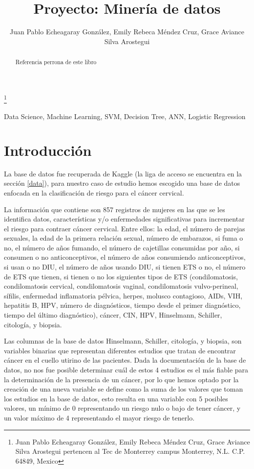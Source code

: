\documentclass[journal]{IEEEtran}                                                          %
\title{\LARGE \bf Proyecto: Minería de datos}
\author{Juan Pablo Echeagaray González, Emily Rebeca Méndez Cruz, Grace Aviance Silva Arostegui}%
\begin{document}
    \thanks{Juan Pablo Echeagaray González, Emily Rebeca Méndez Cruz, Grace Aviance Silva Arostegui pertencen al Tec de Monterrey campus Monterrey, N.L. C.P. 64849, Mexico {\tt\small}}

    \maketitle

    \thispagestyle{empty}
    \pagestyle{empty}

    \begin{abstract}
        Referencia perrona de este libro \cite{geron-2019}
    \end{abstract}

    \begin{IEEEkeywords} 
    Data Science, Machine Learning, SVM, Decision Tree, ANN, Logistic Regression
    \end{IEEEkeywords}

    \section{Introducción} \label{introduction}

        La base de datos fue recuperada de Kaggle (la liga de acceso se encuentra en la sección \ref{data}), para nuestro caso de estudio hemos escogido una base de datos enfocada en la clasificación de riesgo para el cáncer cervical.

        La información que contiene son  857 registros de mujeres en las que se les identifica datos, características y/o enfermedades significativas para incrementar el riesgo para contraer cáncer cervical. Entre ellos: la edad, el número de parejas sexuales, la edad de la primera relación sexual, número de embarazos, si fuma o no, el número de años fumando, el número de cajetillas consumidas por año, si consumen o no anticonceptivos, el número de años consumiendo anticonceptivos, si usan o no DIU, el número de años usando DIU, si tienen ETS o no, el número de ETS que tienen, si tienen o no los siguientes tipos de ETS (condilomatosis, condilomatosis cervical, condilomatosis vaginal, condilomatosis vulvo-perineal, sífilis, enfermedad inflamatoria pélvica, herpes, molusco contagioso, AIDs, VIH, hepatitis B, HPV, número de diagnósticos, tiempo desde el primer diagnóstico, tiempo del último diagnóstico), cáncer, CIN, HPV, Hinselmann, Schiller, citología, y biopsia.

        Las columnas de la base de datos Hinselmann, Schiller, citología, y biopsia, son variables binarias que representan diferentes estudios que tratan de encontrar cáncer en el cuello utirino de las pacientes. Dada la documentación de la base de datos, no nos fue posible determinar cuál de estos 4 estudios es el más fiable para la determinación de la presencia de un cáncer, por lo que hemos optado por la creación de una nueva variable se define como la suma de los valores que toman los estudios en la base de datos, esto resulta en una variable con 5 posibles valores, un mínimo de 0 representando un riesgo nulo o bajo de tener cáncer, y un valor máximo de 4 representando el mayor riesgo de tenerlo.
\end{document}
